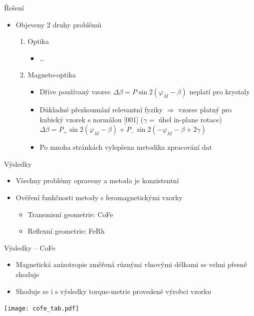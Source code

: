 \documentclass{beamer}
\begin{document}
\begin{frame}{Řešení}
    \begin{itemize}
        \item Objeveny 2 druhy problémů
            \begin{enumerate}
                \item Optika
                    \begin{itemize}
                        \item \ldots
                    \end{itemize}
                \item Magneto-optika
                    \begin{itemize}
                        \item Dříve používaný vzorec $\Delta\beta = P \sin 2 (\varphi_M - \beta)$ neplatí pro krystaly
                        \item Důkladné přezkoumání relevantní fyziky $\Rightarrow$ vzorec platný pro kubický vzorek s normálou [001] ($\gamma = $ úhel in-plane rotace) $\Delta\beta = P_+ \sin 2 (\varphi_M - \beta) +  P_- \sin 2 (-\varphi_M - \beta+2\gamma)$
                        \item Po mnoha stránkách vylepšena metodika zpracování dat
                    \end{itemize}
            \end{enumerate}
    \end{itemize}
\end{frame}

\begin{frame}{Výsledky}
    \begin{itemize}
        \item Všechny problémy opraveny a metoda je konzistentní
        \item Ověření funkčnosti metody s feromagnetickými vzorky
            \begin{itemize}
                \item Transmisní geometrie: CoFe
                \item Reflexní geometrie: FeRh
            \end{itemize}
    \end{itemize}
\end{frame}

\begin{frame}{Výsledky -- CoFe}
    \begin{itemize}
        \item Magnetická anizotropie změřená různými vlnovými délkami se velmi přesně shoduje
        \item Shoduje se i s výsledky torque-metrie provedené výrobci vzorku
    \end{itemize}
    \begin{center}
    \texttt{[image: cofe\_tab.pdf]}
\end{center}
\end{frame}
\end{document}
